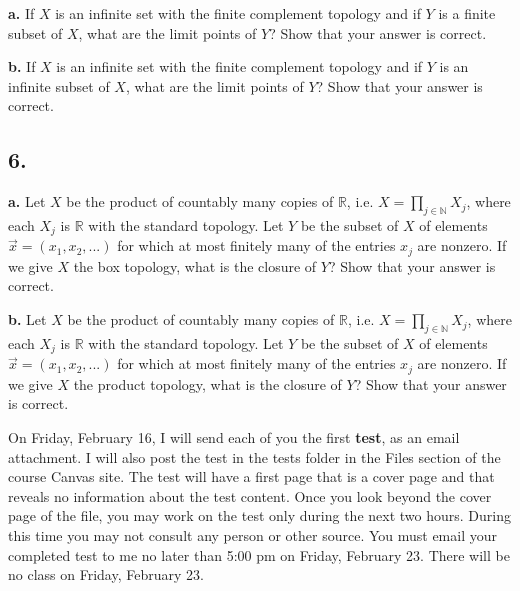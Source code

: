 \documentclass{amsart}
\theoremstyle{plain}
\theoremstyle{definition}
\theoremstyle{remark}
\begin{document}
{\bfseries a.} If $X$ is an infinite set with the finite complement topology and if $Y$ is a finite subset of $X$, what are the limit points of $Y$? Show that your answer is correct. 


\vspace{.1in}
{\bfseries b.} If $X$ is an infinite set with the finite complement topology and if $Y$ is an infinite subset of $X$, what are the limit points of $Y$? Show that your answer is correct. 




\vspace{.15in}

\noindent
\subsection*{6.} 

{\bfseries a.} Let $X$ be the product of countably many copies of $\mathbb R$, i.e. $X = \prod _{j\in \mathbb N } X_j$, where each $X_j$ is $\mathbb R$ with the standard topology. Let $Y$ be the subset of $X$ of elements $\vec{x} = ( x_1 , x_2 , . . . )$ for which at most finitely many of the entries $x_j$ are nonzero. If we give $X$ the box topology, what is the closure of $Y$? Show that your answer is correct. 

\vspace{.1in}

{\bfseries b.} Let $X$ be the product of countably many copies of $\mathbb R$, i.e. $X = \prod _{j\in \mathbb N } X_j$, where each $X_j$ is $\mathbb R$ with the standard topology. Let $Y$ be the subset of $X$ of elements $\vec{x} = ( x_1 , x_2 , . . . )$ for which at most finitely many of the entries $x_j$ are nonzero. If we give $X$ the product topology, what is the closure of $Y$? Show that your answer is correct. 

\vspace{.45in}
On Friday, February 16, I will send each of you the first {\bfseries test}, as an email attachment. I will also post the test in the tests folder in the Files section of the course Canvas site. The test will have a first page that is a cover page and that reveals no information about the test content.   Once you look beyond the cover page of the file, you may work on the test only during the next two hours.  During this time you may not consult any person or other source.  You must email your completed test to me 
no later than 5:00 pm on Friday, February 23.  There will be no class 
on Friday, February 23.  
\end{document}

